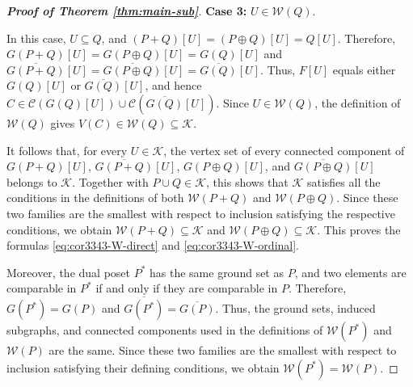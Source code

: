 \documentclass[10pt,a4paper]{amsart}
\begin{document}
\begin{proof}[\rm\textbf{Proof of Theorem \ref{thm:main-sub}}]
\textbf{Case 3:} $U\in\mathcal W(Q)$.

In this case, $U\subseteq Q$, and $(P+Q)[U]=(P\oplus Q)[U]=Q[U]$.
Therefore, $G(P+Q)[U]=G(P\oplus Q)[U]=G(Q)[U]$ and
$\overline{G(P+Q)}[U]=\overline{G(P\oplus Q)}[U]=\overline{G(Q)}[U]$.
Thus, $F[U]$ equals either $G(Q)[U]$ or $\overline{G(Q)}[U]$, 
and hence $C\in\mathcal C(G(Q)[U])\cup\mathcal C(\overline{G(Q)}[U])$.
Since $U\in\mathcal W(Q)$, the definition of $\mathcal W(Q)$ gives
$V(C)\in\mathcal W(Q)\subseteq\mathcal K$.

It follows that, for every $U\in\mathcal K$,
the vertex set of every connected component of
$G(P+Q)[U]$, $\overline{G(P+Q)}[U]$,
$G(P\oplus Q)[U]$, and $\overline{G(P\oplus Q)}[U]$
belongs to $\mathcal K$.
Together with $P\cup Q\in\mathcal K$,
this shows that $\mathcal K$ satisfies all the conditions
in the definitions of both $\mathcal W(P+Q)$
and $\mathcal W(P\oplus Q)$.
Since these two families are the smallest with respect
to inclusion satisfying the respective conditions,
we obtain $\mathcal W(P+Q)\subseteq\mathcal K$
and $\mathcal W(P\oplus Q)\subseteq\mathcal K$.
This proves the formulas \eqref{eq:cor3343-W-direct}
and \eqref{eq:cor3343-W-ordinal}.

Moreover, the dual poset $P^*$ has the same ground set as $P$,
and two elements are comparable in $P^*$
if and only if they are comparable in $P$.
Therefore, $G(P^*)=G(P)$ and
$\overline{G(P^*)}=\overline{G(P)}$.
Thus, the ground sets, induced subgraphs, and connected components
used in the definitions of $\mathcal W(P^*)$ and $\mathcal W(P)$
are the same.
Since these two families are the smallest with respect
to inclusion satisfying their defining conditions,
we obtain $\mathcal W(P^*)=\mathcal W(P)$.


\end{proof}
\end{document}
